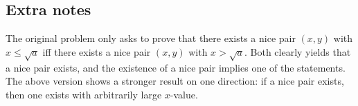 \documentclass{article}
\begin{document}
\subsection*{Extra notes}

The original problem only asks to prove that there exists a nice pair $(x, y)$ with $x \leq \sqrt{a}$ iff there exists a nice pair $(x, y)$ with $x > \sqrt{a}$.
Both clearly yields that a nice pair exists, and the existence of a nice pair implies one of the statements.
The above version shows a stronger result on one direction: if a nice pair exists, then one exists with arbitrarily large $x$-value.
\end{document}
